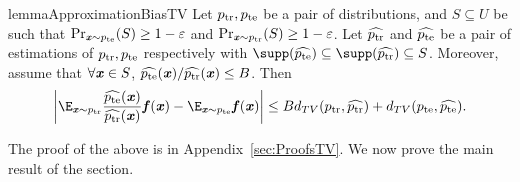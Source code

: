 \begin{restatable}{lemma}{ApproximationBiasTV}
\label{lem:approximation_2}
Let $p_{\mathrm{tr}}, p_{\mathrm{te}}$ be a pair of distributions, and $S \subseteq U$ be such that $\Pr_{\boldsymbol{\mathit{x}}\sim p_{\mathrm{te}}}(S) \geq 1-\varepsilon$ and $\Pr_{\boldsymbol{\mathit{x}}\sim p_{\mathrm{tr}}}(S) \geq 1-\varepsilon$. Let $\widehat{p_{\mathrm{tr}}}$ and $\widehat{p_{\mathrm{te}}}$ be a pair of estimations of $p_{\mathrm{tr}},p_{\mathrm{te}}$ respectively with $\supp (\widehat{\pte}) \subseteq \supp (\widehat{\ptr}) \subseteq S$. Moreover, assume that $\forall \boldsymbol{\mathit{x}}\in S$, $\widehat{p_{\mathrm{te}}}(\boldsymbol{\mathit{x}}) / \widehat{p_{\mathrm{tr}}}(\boldsymbol{\mathit{x}}) \leq B$. Then
\begin{equation*}
    \left|\E_{\xx\sim \ptr} \frac{\widehat{\pte}(\xx)}{\widehat{\ptr}(\xx)} \ff(\xx) - \E_{\xx\sim \pte} \ff(\xx)\right|  \leq B d_{TV}(\ptr, \widehat{\ptr}) + d_{TV}(\pte, \widehat{\pte}).
\end{equation*}
\end{restatable}
The proof of the above is in Appendix~\ref{sec:ProofsTV}. We now prove the main result of the section.
